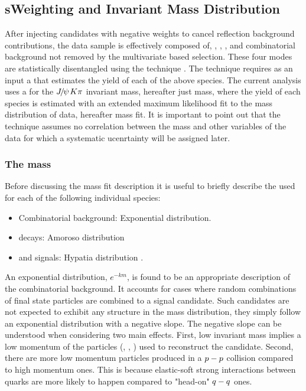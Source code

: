 \subsection{sWeighting and Invariant Mass Distribution}
\label{sWeighting_and_mass}

After injecting candidates with negative weights to cancel reflection background contributions,
the data sample is effectively composed of, \BdJpsiKpi, \BsJpsiKpi, \LbJpsippi, and combinatorial background not removed by the
multivariate based selection. These four modes are statistically disentangled using the \sPlot technique \cite{splot}.
The technique requires as an input a \pdf that estimates the yield of each of the above species. The current analysis uses
a \pdf for the ${J\mskip -3mu/\mskip -2mu\psi\mskip 2mu} K\pi$ invariant mass, hereafter just mass, where the yield of each species is estimated with an extended
maximum likelihood fit to the mass distribution of data, hereafter mass fit. It is important to point out that the \sPlot
technique assumes no correlation between the mass and other variables of the data for which a systematic ucenrtainty
will be assigned later.

\subsubsection{The mass \pdf}
Before discussing the mass fit description it is useful to briefly describe the \pdfs used for each of the following individual species:

\begin{itemize}
\item Combinatorial background: Exponential distribution.
\item \LbJpsippi decays: Amoroso distribution \cite{Amoroso}
\item \Bd and \Bs signals: Hypatia distribution \cite{Santos:2013gra}.
\end{itemize}

\noindent An exponential distribution, $e^{-km}$, is found to be an appropriate description of the combinatorial background. It accounts
for cases where random combinations of final state particles are combined to a signal candidate. Such candidates are not expected to
exhibit any structure in the mass distribution, they simply follow an exponential distribution with a negative slope.
The negative slope can be understood when considering two main effects. First, low invariant mass implies a low momentum of
the particles (\kaon, \pion, \mmu) used to reconstruct the \BsJpsiKst candidate. Second, there are more low momentum particles produced in
a $p-p$ collision compared to high momentum ones. This is because elastic-soft strong interactions between quarks are more
likely to happen compared to "head-on" $q-q$ ones.

